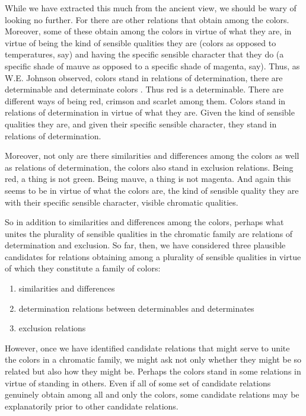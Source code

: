 \documentclass[12pt]{article}
\begin{document}
While we have extracted this much from the ancient view, we should be wary of looking no further. For there are other relations that obtain among the colors. Moreover, some of these obtain among the colors in virtue of what they are, in virtue of being the kind of sensible qualities they are (colors as opposed to temperatures, say) and having the specific sensible character that they do (a specific shade of mauve as opposed to a specific shade of magenta, say). Thus, as W.E. Johnson \citeyearpar{Johnson:1921fk} observed, colors stand in relations of determination, there are determinable and determinate colors \citep[for recent discussion see][]{Funkhouser:2006as}. Thus red is a determinable. There are different ways of being red, crimson and scarlet among them. Colors stand in relations of determination in virtue of what they are. Given the kind of sensible qualities they are, and given their specific sensible character, they stand in relations of determination. 

Moreover, not only are there similarities and differences among the colors as well as relations of determination, the colors also stand in exclusion relations. Being red, a thing is not green. Being mauve, a thing is not magenta. And again this seems to be in virtue of what the colors are, the kind of sensible quality they are with their specific sensible character, visible chromatic qualities. 

So in addition to similarities and differences among the colors, perhaps what unites the plurality of sensible qualities in the chromatic family are relations of determination and exclusion. So far, then, we have considered three plausible candidates for relations obtaining among a plurality of sensible qualities in virtue of which they constitute a family of colors:
\begin{enumerate}
	\item similarities and differences
	\item determination relations between determinables and determinates
	\item exclusion relations
\end{enumerate}
However, once we have identified candidate relations that might serve to unite the colors in a chromatic family, we might ask not only whether they might be so related but also how they might be. Perhaps the colors stand in some relations in virtue of standing in others. Even if all of some set of candidate relations genuinely obtain among all and only the colors, some candidate relations may be explanatorily prior to other candidate relations.
\end{document}
